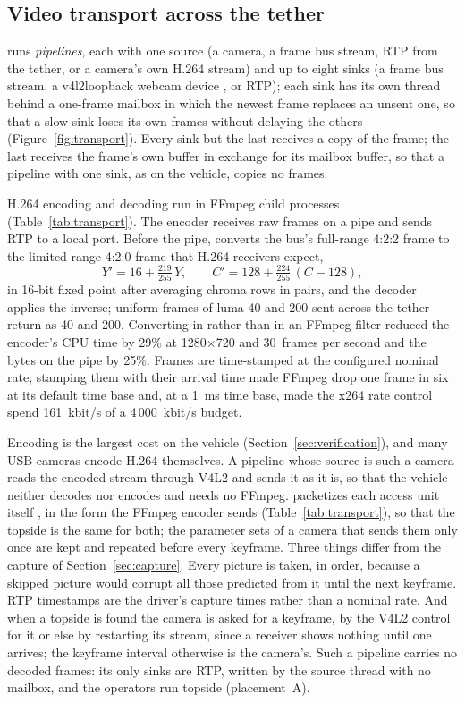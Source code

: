 \subsection{Video transport across the tether}\label{sec:transport}

\hellion{} runs \emph{pipelines}, each with one source (a camera, a
  frame bus stream,
RTP from the tether, or a camera's own H.264 stream) and up to eight
sinks (a frame bus stream, a v4l2loopback
webcam device \cite{v4l2loopback}, or RTP); each sink has its own
thread behind a
one-frame mailbox in which the newest frame replaces an unsent one,
so that a slow
sink loses its own frames without delaying the others
(Figure~\ref{fig:transport}).
Every sink but the last receives a copy of the frame; the last
receives the frame's
own buffer in exchange for its mailbox buffer, so that a pipeline
with one sink, as
on the vehicle, copies no frames.

H.264 encoding and decoding run in FFmpeg child processes \cite{ffmpeg}
(Table~\ref{tab:transport}). The encoder receives raw frames on a
pipe and sends RTP
to a local port. Before the pipe, \hellion{} converts the bus's
full-range 4:2:2 frame
to the limited-range 4:2:0 frame that H.264 receivers expect,
\begin{equation}\label{eq:range}
  Y' = 16 + \tfrac{219}{255}\,Y, \qquad C' = 128 + \tfrac{224}{255}\,(C - 128),
\end{equation}
in 16-bit fixed point after averaging chroma rows in pairs, and the
decoder applies
the inverse; uniform frames of luma 40 and 200 sent across the tether
return as 40 and
200. Converting in \hellion{} rather than in an FFmpeg filter reduced
the encoder's
CPU time by 29\% at 1280$\times$720 and 30~frames per second and the
bytes on the pipe
by 25\%. Frames are time-stamped at the configured nominal rate;
stamping them with
their arrival time made FFmpeg drop one frame in six at its default
time base and,
at a 1~ms time base, made the x264 rate control spend 161~kbit/s of a
4\,000~kbit/s
budget.

Encoding is the largest cost on the vehicle
(Section~\ref{sec:verification}), and many
USB cameras encode H.264 themselves. A pipeline whose source is such
a camera reads the
encoded stream through V4L2 and sends it as it is, so that the
vehicle neither decodes
nor encodes and needs no FFmpeg. \hellion{} packetizes each access unit itself
\cite{rfc6184}, in the form the FFmpeg encoder sends
(Table~\ref{tab:transport}), so
that the topside is the same for both; the parameter sets of a camera
that sends them
only once are kept and repeated before every keyframe. Three things
differ from the
capture of Section~\ref{sec:capture}. Every picture is taken, in
order, because a
skipped picture would corrupt all those predicted from it until the
next keyframe. RTP
timestamps are the driver's capture times rather than a nominal rate. And when a
topside is found the camera is asked for a keyframe, by the V4L2
control for it or
else by restarting its stream, since a receiver shows nothing until
one arrives; the
keyframe interval otherwise is the camera's. Such a pipeline carries no decoded
frames: its only sinks are RTP, written by the source thread with no
mailbox, and the
operators run topside (placement~A).

